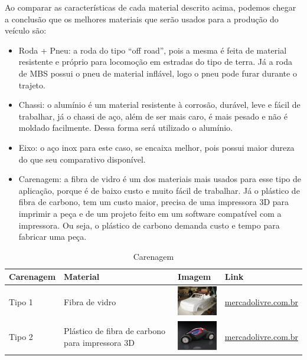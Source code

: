   Ao comparar as características de cada material descrito acima, podemos chegar a conclusão que os melhores materiais que
  serão usados para a produção do veículo são:

  \begin{itemize}
    \item Roda + Pneu: a roda do tipo “off road”, pois a mesma é feita de material resistente e próprio para locomoção em estradas do tipo de terra. Já a roda de MBS possui o pneu de material inflável, logo o pneu pode furar durante o trajeto.
    \item Chassi: o alumínio é um material resistente à corrosão, durável, leve e fácil de trabalhar, já o chassi de aço, além de ser mais caro, é mais pesado e não é moldado facilmente. Dessa forma será utilizado o alumínio.
    \item Eixo: o aço inox para este caso, se encaixa melhor, pois possui maior dureza do que seu comparativo disponível.
    \item Carenagem: a fibra de vidro é um dos materiais mais usados para esse tipo de aplicação, porque é de baixo custo e muito fácil de trabalhar. Já o plástico de fibra de carbono, tem um custo maior, precisa de uma impressora 3D para imprimir a peça e de um projeto feito em um software compatível com a  impressora. Ou seja, o plástico de carbono demanda custo e tempo para fabricar uma peça.
  \end{itemize}

  \begin{table}[!htbp]
  \begin{center}
  \caption{Carenagem}
  \begin{tabular}{|p{3cm}|p{3cm}|p{2cm}|p{4cm}|}
  \hline
  \textbf{Carenagem} & \textbf{Material} & \textbf{Imagem} & \textbf{Link}\\\hline\hline
  Tipo 1 & Fibra de vidro & \includegraphics[width=2cm]{figuras/carenagem_fibra.eps} & \href{http://produto.mercadolivre.com.br/MLB-712761072-kit-resina-500g-manta-fibra-de-vidro-300g-10g-catalizador-_JM}{mercadolivre.com.br}\\\hline
  Tipo 2 & Plástico de fibra de carbono para impressora 3D & \includegraphics[width=2cm]{figuras/carenagem_plastico.eps} & \href{http://produto.mercadolivre.com.br/MLB-704169297-envelopamento-fibra-carbono-teto-ou-capo-1x122-_JM}{mercadolivre.com.br}\\\hline
  \end{tabular}
  \end{center}
  \end{table}

